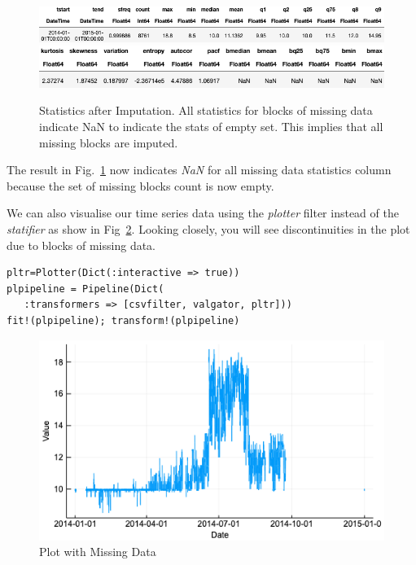 \documentclass{juliacon}
\begin{document}
\begin{figure}[htbp]
   \centering
   \includegraphics[width=\columnwidth]{imputed1.png} %
   \vskip 2pt
      \includegraphics[width=\columnwidth]{imputed2.png} %
   \caption{Statistics after Imputation. All statistics for blocks of missing data indicate NaN to indicate the stats of empty set. This implies that all missing blocks are imputed.}
   \label{fig:imputation}
\end{figure}

The result in Fig.~\ref{fig:imputation} now indicates \emph{NaN} for all missing data statistics column because the set 
of missing blocks count is now empty.

\vskip 3pt

We can also visualise our time series data using the \emph{plotter} filter instead of the \emph{statifier} as show in Fig~\ref{fig:mplot}. Looking closely, you will see discontinuities in the plot due to blocks of missing data.

\begin{lstlisting}
pltr=Plotter(Dict(:interactive => true))
plpipeline = Pipeline(Dict(
   :transformers => [csvfilter, valgator, pltr]))
fit!(plpipeline); transform!(plpipeline)
\end{lstlisting}

\begin{figure}[htbp]
   \centering
   \includegraphics[width=\columnwidth]{mplot.png} %
   \caption{Plot with Missing Data}
   \label{fig:mplot}
\end{figure}
\end{document}
